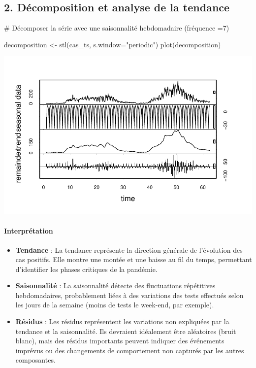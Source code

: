 \documentclass[
  letterpaper,
  DIV=11,
  numbers=noendperiod]{scrartcl}
\let\oldparagraph\paragraph
\renewcommand{\paragraph}[1]{\oldparagraph{#1}\mbox{}}
\newenvironment{Shaded}{\begin{snugshade}}{\end{snugshade}}
\newcommand{\AttributeTok}[1]{\textcolor[rgb]{0.40,0.45,0.13}{#1}}
\newcommand{\CommentTok}[1]{\textcolor[rgb]{0.37,0.37,0.37}{#1}}
\newcommand{\FunctionTok}[1]{\textcolor[rgb]{0.28,0.35,0.67}{#1}}
\newcommand{\NormalTok}[1]{\textcolor[rgb]{0.00,0.23,0.31}{#1}}
\newcommand{\OtherTok}[1]{\textcolor[rgb]{0.00,0.23,0.31}{#1}}
\newcommand{\StringTok}[1]{\textcolor[rgb]{0.13,0.47,0.30}{#1}}
\begin{document}
\subsection{2. Décomposition et analyse de la
tendance}\label{duxe9composition-et-analyse-de-la-tendance}

\begin{Shaded}
\begin{Highlighting}[]
\CommentTok{\# Décomposer la série avec une saisonnalité hebdomadaire (fréquence =7)}

\NormalTok{decomposition }\OtherTok{\textless{}{-}} \FunctionTok{stl}\NormalTok{(cas\_ts, }\AttributeTok{s.window=}\StringTok{"periodic"}\NormalTok{)}
\FunctionTok{plot}\NormalTok{(decomposition)}
\end{Highlighting}
\end{Shaded}

\includegraphics{TS_files/figure-pdf/unnamed-chunk-2-1.pdf}

\paragraph{Interprétation}\label{interpruxe9tation}

\begin{itemize}
\item
  \textbf{Tendance} : La tendance représente la direction générale de
  l'évolution des cas positifs. Elle montre une montée et une baisse au
  fil du temps, permettant d'identifier les phases critiques de la
  pandémie.
\item
  \textbf{Saisonnalité} : La saisonnalité détecte des fluctuations
  répétitives hebdomadaires, probablement liées à des variations des
  tests effectués selon les jours de la semaine (moins de tests le
  week-end, par exemple).
\item
  \textbf{Résidus} : Les résidus représentent les variations non
  expliquées par la tendance et la saisonnalité. Ils devraient
  idéalement être aléatoires (bruit blanc), mais des résidus importants
  peuvent indiquer des événements imprévus ou des changements de
  comportement non capturés par les autres composantes.\\
  \strut \\
\end{itemize}
\end{document}
